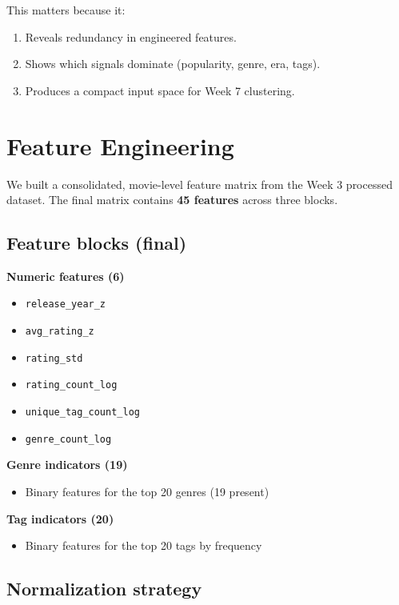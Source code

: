 \documentclass[11pt]{article}
\begin{document}
This matters because it:

\begin{enumerate}[leftmargin=1.5em]
    \item Reveals redundancy in engineered features.
    \item Shows which signals dominate (popularity, genre, era, tags).
    \item Produces a compact input space for Week 7 clustering.
\end{enumerate}

\section{Feature Engineering}

We built a consolidated, movie-level feature matrix from the Week 3 processed dataset. The final matrix contains \textbf{45 features} across three blocks.

\subsection{Feature blocks (final)}

\textbf{Numeric features (6)}

\begin{itemize}[leftmargin=1.5em]
    \item \texttt{release\_year\_z}
    \item \texttt{avg\_rating\_z}
    \item \texttt{rating\_std}
    \item \texttt{rating\_count\_log}
    \item \texttt{unique\_tag\_count\_log}
    \item \texttt{genre\_count\_log}
\end{itemize}

\textbf{Genre indicators (19)}

\begin{itemize}[leftmargin=1.5em]
    \item Binary features for the top 20 genres (19 present)
\end{itemize}

\textbf{Tag indicators (20)}

\begin{itemize}[leftmargin=1.5em]
    \item Binary features for the top 20 tags by frequency
\end{itemize}

\subsection{Normalization strategy}
\end{document}
